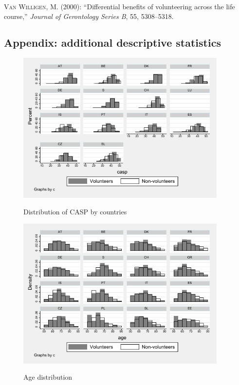\documentclass[10pt, letterpaper]{article}
\begin{document}
\begin{spacing}{1.4}
\begin{thebibliography}{87}
\textsc{Van Willigen, M.} (2000): \enquote{Differential benefits of volunteering across the life course,} \emph{Journal of Gerontology Series B}, 55, 5308--5318.


\end{thebibliography}


\begin{spacing}{.9}

\section{Appendix: additional descriptive statistics}


\begin{figure}[H]
 \includegraphics[height=3in]{hist_casp.pdf}
 \centering
 \label{fig:hist_casp}
\caption{Distribution of CASP by countries}
\end{figure}

\begin{tiny} 
\begin{spacing}{.9}
	 
      \label{KendallCasp} 
\end{spacing}
\end{tiny}


 

\begin{figure}[H]
 \includegraphics[height=3in]{hist_age.pdf}
 \centering
 \label{fig:hist_age}
\caption{Age distribution}
\end{figure}



\end{spacing}
\end{spacing}
\end{document}
